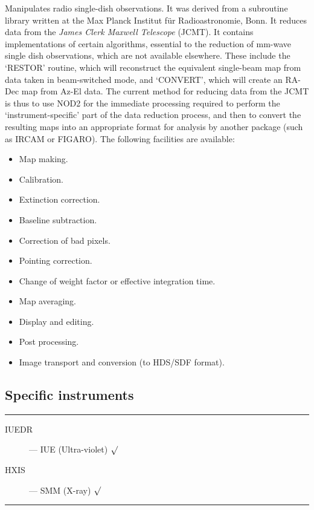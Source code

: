 \begin{description}
Manipulates radio single-dish observations.
It was derived from a subroutine library written at the Max Planck Institut
f\"{u}r Radioastronomie, Bonn.
It reduces data from the {\em James Clerk Maxwell Telescope} (JCMT).
It contains implementations of certain algorithms, essential to the reduction
of mm-wave single dish observations, which are not available elsewhere.
These include the `RESTOR' routine, which will reconstruct the equivalent
single-beam map from data taken in beam-switched mode, and `CONVERT', which
will create an RA-Dec map from Az-El data.
The current method for reducing data from the JCMT is thus to use NOD2 for the
immediate processing required to perform the `instrument-specific' part of the
data reduction process, and then to convert the resulting maps into an
appropriate format for analysis by another package (such as IRCAM or FIGARO).
The following facilities are available:
\begin{itemize}
\item Map making.
\item Calibration.
\item Extinction correction.
\item Baseline subtraction.
\item Correction of bad pixels.
\item Pointing correction.
\item Change of weight factor or effective integration time.
\item Map averaging.
\item Display and editing.
\item Post processing.
\item Image transport and conversion (to HDS/SDF format).
\end{itemize}

\end{description}

\newpage

\subsection{Specific instruments}

\rule{\textwidth}{0.5mm}
\begin{description}
\begin{description}
\item [IUEDR] --- IUE (Ultra-violet) \hfill $\surd$
\item [HXIS] --- SMM (X-ray) \hfill $\surd$
\end{description}
\end{description}
\rule{\textwidth}{0.5mm}

